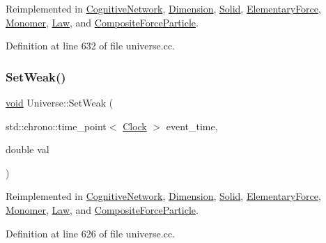 Reimplemented in \mbox{\hyperlink{class_cognitive_network_a6f7210dd8c2786518329faa61b6e14d5}{Cognitive\+Network}}, \mbox{\hyperlink{class_dimension_a9bd5480b1da689cd58bf61dac7169080}{Dimension}}, \mbox{\hyperlink{class_solid_a8b80ebe209fcd3afa4791968127753d0}{Solid}}, \mbox{\hyperlink{class_elementary_force_ac25021d38c1d54bf711096ab37a461f6}{Elementary\+Force}}, \mbox{\hyperlink{class_monomer_ae6ca57913da27fa749d33d1c4fed27ca}{Monomer}}, \mbox{\hyperlink{class_law_ad4a05c77d11ddec40b1e07246cac449d}{Law}}, and \mbox{\hyperlink{class_composite_force_particle_aeba1070d4ec6e52fd8276e38c6a6c2e1}{Composite\+Force\+Particle}}.



Definition at line 632 of file universe.\+cc.

\mbox{\label{class_universe_a0f5cd04081b41ee931c0557dc397f6fb}} 
\subsubsection{\texorpdfstring{Set\+Weak()}{SetWeak()}}
{\footnotesize\ttfamily \mbox{\hyperlink{glad_8h_a950fc91edb4504f62f1c577bf4727c29}{void}} Universe\+::\+Set\+Weak (\begin{DoxyParamCaption}\item[{std\+::chrono\+::time\+\_\+point$<$ \mbox{\hyperlink{universe_8h_a0ef8d951d1ca5ab3cfaf7ab4c7a6fd80}{Clock}} $>$}]{event\+\_\+time,  }\item[{double}]{val }\end{DoxyParamCaption})\hspace{0.3cm}{\ttfamily [virtual]}}



Reimplemented in \mbox{\hyperlink{class_cognitive_network_ab39c9eed50da6d3630c4498ae64b804e}{Cognitive\+Network}}, \mbox{\hyperlink{class_dimension_a157cfa28dd6bc5518d622d01445ca827}{Dimension}}, \mbox{\hyperlink{class_solid_aa28e0f7e4de2fc0c1e28d385214296bf}{Solid}}, \mbox{\hyperlink{class_elementary_force_a093cdf0810e95f1d973bd9dc88c6788b}{Elementary\+Force}}, \mbox{\hyperlink{class_monomer_ad4fe1db33f493575281e1a2fb35004ca}{Monomer}}, \mbox{\hyperlink{class_law_a1009b4e0bc0b91f41d48dc137529e97b}{Law}}, and \mbox{\hyperlink{class_composite_force_particle_a7899a6efda98b062051e37c25c214e2a}{Composite\+Force\+Particle}}.



Definition at line 626 of file universe.\+cc.

